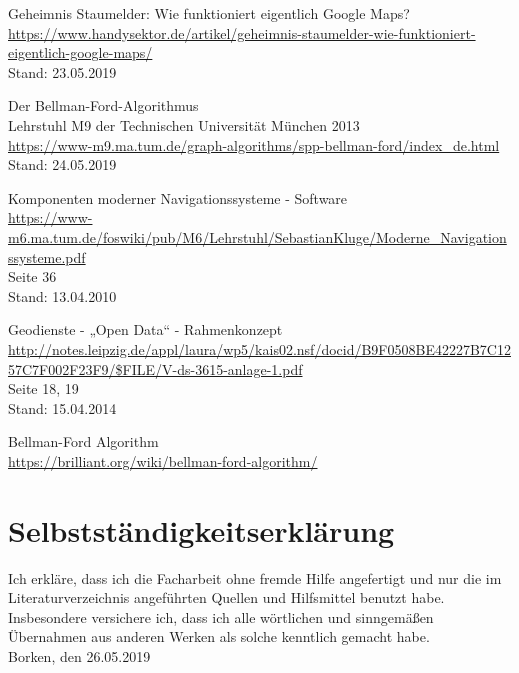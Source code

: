 \documentclass[12pt]{article}
\begin{document}
\begin{thebibliography}{xxxxxxxxxxxxxxxxxxxxxxxxxxxxx}
		 Geheimnis Staumelder: Wie funktioniert eigentlich Google Maps?\\ \url{https://www.handysektor.de/artikel/geheimnis-staumelder-wie-funktioniert-eigentlich-google-maps/}\\
		Stand: 23.05.2019
		
		 Der Bellman-Ford-Algorithmus\\
		Lehrstuhl M9 der Technischen Universität München 2013\\
		\url{https://www-m9.ma.tum.de/graph-algorithms/spp-bellman-ford/index_de.html}\\
		Stand: 24.05.2019
		
		 Komponenten moderner Navigationssysteme - Software\\
		\url{https://www-m6.ma.tum.de/foswiki/pub/M6/Lehrstuhl/SebastianKluge/Moderne_Navigationssysteme.pdf}\\
		Seite 36\\
		Stand: 13.04.2010
		
		 Geodienste - „Open Data“ - Rahmenkonzept\\
		\url{http://notes.leipzig.de/appl/laura/wp5/kais02.nsf/docid/B9F0508BE42227B7C1257C7F002F23F9/$FILE/V-ds-3615-anlage-1.pdf}\\
		Seite 18, 19\\
		Stand: 15.04.2014
		
		 Bellman-Ford Algorithm\\
		\url{https://brilliant.org/wiki/bellman-ford-algorithm/}
		

	\end{thebibliography}


\newpage
\section{Selbstständigkeitserklärung}
	Ich erkläre, dass ich die Facharbeit ohne fremde Hilfe angefertigt und nur die im Literaturverzeichnis angeführten Quellen und Hilfsmittel benutzt habe. Insbesondere versichere ich, dass ich alle wörtlichen und sinngemäßen Übernahmen aus anderen Werken als solche kenntlich gemacht habe.\\
	
	Borken, den 26.05.2019
\end{document}

